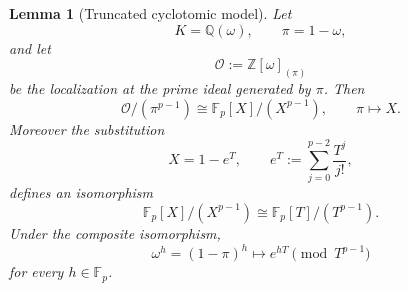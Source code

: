 \documentclass[11pt]{article}
\newtheorem{lemma}[theorem]{Lemma}
\newcommand{\F}{\mathbb F}
\begin{document}
\begin{lemma}[Truncated cyclotomic model]
\label{lem:truncated-cyclotomic-model}
Let
\[
 K=\mathbb Q(\omega),\qquad
 \pi=1-\omega,
\]
and let
\[
 \mathcal O:=\mathbb Z[\omega]_{(\pi)}
\]
be the localization at the prime ideal generated by \(\pi\).  Then
\begin{equation}
 \mathcal O/(\pi^{p-1})
 \cong
 \F_p[X]/(X^{p-1}),
 \qquad
 \pi\longmapsto X.
 \label{eq:cyclotomic-truncation}
\end{equation}
Moreover the substitution
\begin{equation}
 X=1-e^T,
 \qquad
 e^T:=\sum_{j=0}^{p-2}\frac{T^j}{j!},
 \label{eq:formal-change-rigorous}
\end{equation}
defines an isomorphism
\[
 \F_p[X]/(X^{p-1})
 \cong
 \F_p[T]/(T^{p-1}).
\]
Under the composite isomorphism,
\begin{equation}
 \omega^h=(1-\pi)^h
 \longmapsto
 e^{hT}
 \pmod{T^{p-1}}
 \label{eq:omega-to-exp}
\end{equation}
for every \(h\in\F_p\).
\end{lemma}
\end{document}
